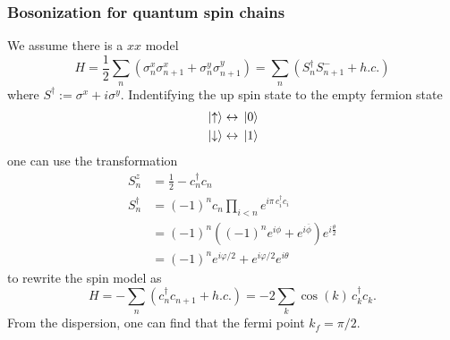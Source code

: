 \documentclass[submission, PhysLectNotes]{SciPost}
\begin{document}
\subsubsection{Bosonization for quantum spin chains}
We assume there is a $xx$ model 
\begin{equation}
	H = \frac{1}{2}\sum_n \left(\sigma_n^x\sigma_{n+1}^x + \sigma_n^y\sigma_{n+1}^y \right) = \sum_n \left(S^\dagger_n S^{-}_{n+1} + h.c.\right)
\end{equation}
where $S^\dagger := \sigma^x + i\sigma^y$. Indentifying the up spin state to the empty fermion state
\begin{equation}
	\begin{aligned}
		&\ket*{\uparrow} \leftrightarrow \ket*{0}\\
		&\ket*{\downarrow} \leftrightarrow \ket*{1}
	\end{aligned}
\end{equation}
one can use the transformation
\begin{equation}
	\begin{aligned}
		S_n^z &= \frac{1}{2} - c_n^\dagger c_n \\
		S_n^\dagger &= \left(-1\right)^n c_n \prod_{i<n}e^{i\pi\,c_i^\dagger c_i} \\
		&= (-1)^n \left( (-1)^n e^{i\phi} + e^{i\overline{\phi}}\right) e^{i\frac{\theta}{2}} \\
		&= (-1)^n e^{i\varphi/2} + e^{i\varphi/2} e^{i\theta}
	\end{aligned}
\end{equation}
to rewrite the spin model as 
\begin{equation}
	H = -\sum_n \left(c_n^\dagger c_{n+1} + h.c.\right) = -2\sum_k \cos(k)\,c_k^\dagger c_k.
\end{equation}
From the dispersion, one can find that the fermi point $k_f = \pi/2$. 
\end{document}
